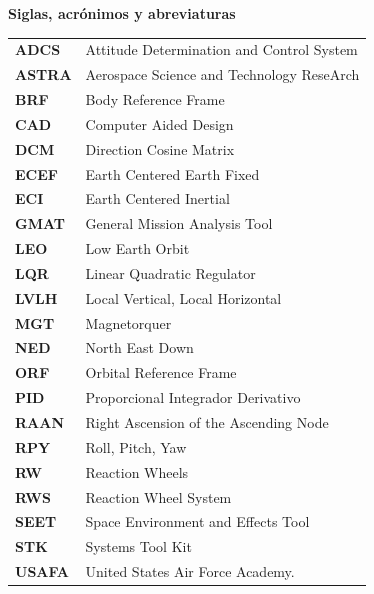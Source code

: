     
    
    
\newpage
    \thispagestyle{empty}
    
    \renewcommand{\listfigurename}{\centerline{\normalfont\normalsize LISTA DE FIGURAS}}
    \listoffigures 
    
    
    
    
\newpage
    \thispagestyle{empty}
    
\begin{center}
    \textbf{Siglas, acrónimos y abreviaturas}    %
\end{center}

\begin{tabular}{m{2cm}p{10cm}}
    \textbf{ADCS}  & Attitude Determination and Control System   \\
    \textbf{ASTRA} & Aerospace   Science and Technology ReseArch \\
    \textbf{BRF}   & Body Reference Frame                        \\
    \textbf{CAD}   & Computer Aided Design                       \\
    \textbf{DCM}   & Direction Cosine Matrix                     \\
    \textbf{ECEF}  & Earth Centered Earth Fixed                  \\
    \textbf{ECI}   & Earth Centered Inertial                     \\
    \textbf{GMAT}  & General   Mission Analysis Tool             \\
    \textbf{LEO}   & Low Earth Orbit                             \\
    \textbf{LQR}   & Linear Quadratic Regulator                  \\
    \textbf{LVLH}  & Local Vertical, Local Horizontal            \\
    \textbf{MGT}   & Magnetorquer                                \\
    \textbf{NED}   & North East Down                             \\
    \textbf{ORF}   & Orbital Reference Frame                     \\
    \textbf{PID}   & Proporcional Integrador Derivativo          \\
    \textbf{RAAN}  & Right Ascension of the Ascending Node     \\
    \textbf{RPY}   & Roll, Pitch, Yaw                            \\
    \textbf{RW}    & Reaction Wheels                             \\
    \textbf{RWS}   & Reaction Wheel System                       \\
    \textbf{SEET}  & Space Environment and Effects Tool          \\
    \textbf{STK}   & Systems Tool Kit                            \\
    \textbf{USAFA} & United States Air Force   Academy.
\end{tabular}
